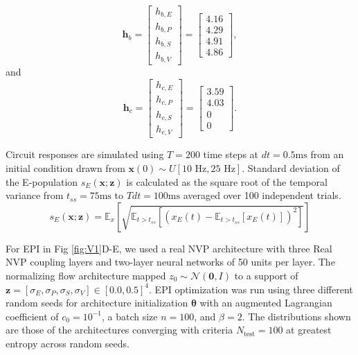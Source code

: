 \documentclass[11pt]{article}
\begin{document}
\begin{equation}
\mathbf{h}_b =  \begin{bmatrix} h_{b,E} \\ h_{b,P} \\ h_{b,S} \\ h_{b,V} \end{bmatrix} =
 \begin{bmatrix} 4.16 \\ 4.29 \\ 4.91 \\ 4.86 \end{bmatrix} ,
\end{equation} 
and
\begin{equation} 
\mathbf{h}_c = \begin{bmatrix} h_{c,E} \\ h_{c,P} \\ h_{c,S} \\ h_{c,V} \end{bmatrix} = 
\begin{bmatrix} 3.59 \\ 4.03 \\ 0 \\ 0 \end{bmatrix}.
\end{equation} 

Circuit responses are simulated using $T = 200$ time steps at $dt = 0.5\text{ms}$ from an initial condition drawn from $\mathbf{x}(0) \sim U\left[10\text{ Hz}, 25\text{ Hz}\right]$.
Standard deviation of the E-population $s_E(\mathbf{x}; \mathbf{z})$ is calculated as the square root of the temporal variance from $t_{ss} = 75\text{ms}$ to $Tdt = 100\text{ms}$ averaged over 100 independent trials.
\begin{equation}
s_E(\mathbf{x}; \mathbf{z}) =\mathbb{E}_{x}\left[\sqrt{\mathbb{E}_{t > t_{ss}}\left[\left(x_E(t) -\mathbb{E}_{t > t_{ss}}\left[ x_E(t) \right]\right)^2 \right]}\right]
\end{equation}

For EPI in Fig \ref{fig:V1}D-E, we used a real NVP architecture with three Real NVP coupling layers and two-layer neural networks of 50 units per layer.
The normalizing flow architecture mapped $z_0 \sim \mathcal{N}(\mathbf{0}, I)$ to a support of $\mathbf{z} = [\sigma_E, \sigma_P, \sigma_S, \sigma_V] \in [0.0, 0.5]^4$.
EPI optimization was run using three different random seeds for architecture initialization $\bm{\theta}$ with an augmented Lagrangian coefficient of $c_0 = 10^{-1}$, a batch size $n=100$, and $\beta = 2$.
The distributions shown are those of the architectures converging with criteria $N_{\text{test}} = 100$ at greatest entropy across random seeds.
\end{document}
